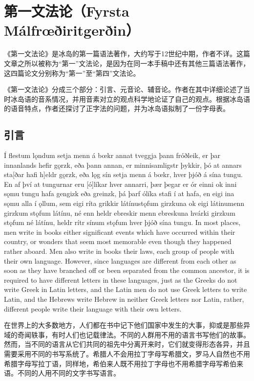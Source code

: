 \chapter{第一文法论（Fyrsta Málfrœðiritgerðin）}

《第一文法论》是冰岛的第一篇语法著作，大约写于12世纪中期，作者不详。这篇文章之所以被称为“第一”文法论，是因为在同一本手稿中还有其他三篇语法著作，这四篇论文分别称为“第一”至“第四”文法论。

《第一文法论》分成三个部分：引言\footnotemark、元音论、辅音论。作者在其中详细论述了当时冰岛语的音系情况，并用音素对立的观点科学地论证了自己的观点。根据冰岛语的语音特点，作者还探讨了正字法的问题，并为冰岛语拟制了一份字母表。
\section{引言}
\begin{paracol}{2}
  Í flestum lǫndum setja menn á bœkr annat tveggja þann fróðleik, er þar innanlands hefir gǫrzk, eða þann annan, er minnisamligstr þykkir, þó at annars sta[ðar hafi h]eldr gǫrzk, eða lǫg sín setja menn á bœkr, hver þjóð á sína tungu. En af því at tungurnar eru [ó]líkar hver annarri, þær þegar er ór einni ok inni sǫmu tungu hafa gengizk eða greinzk, þá þarf ólíka stafi í at hafa, en eigi ina sǫmu alla í ǫllum, sem eigi ríta grikkir látínustǫfum girzkuna ok eigi látinumenn girzkum stǫfum látínu, né enn heldr ebreskir menn ebreskuna hvárki girzkum stǫfum né látínu, heldr rítr sínum stǫfum hver þjóð sína tungu.
  \switchcolumn
  In most places, men write in books either significant events which have occurred within their country, or wonders that seem most memorable even though they happened rather aboard. Men also write in books their laws, each group of people with their own language. However, since languages are different from each other as soon as they have branched off or been separated from the common ancestor, it is required to have different letters in these languages, just as the Greeks do not write Greek in Latin letters, and the Latin men do not use Greek letters to write Latin, and the Hebrews write Hebrew in neither Greek letters nor Latin, rather, different people write their language with their own letters.
\end{paracol}
\begin{translation*}{}
  在世界上的大多数地方，人们都在书中记下他们国家中发生的大事，抑或是那些异域的奇闻轶事，有时人们也记载律法。不同的人群用不用的语言书写他们的故事。然而，当不同的语言从它们共同的祖先中分离开来时，它们就变得形态各异，并且需要采用不同的书写系统了。希腊人不会用拉丁字母写希腊文，罗马人自然也不用希腊字母写拉丁语，同样地，希伯来人既不用拉丁字母也不用希腊字母写希伯来语。不同的人用不同的文字书写语言。
\end{translation*}
